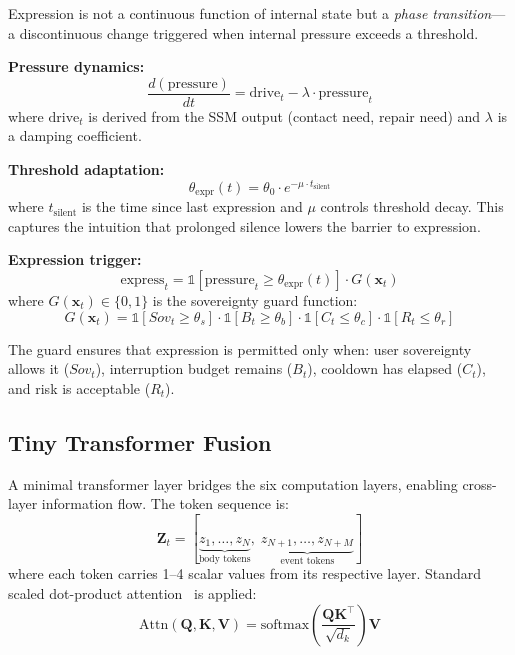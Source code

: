 \documentclass[10pt,twocolumn]{article}
\begin{document}
Expression is not a continuous function of internal state but a \emph{phase transition}---a discontinuous change triggered when internal pressure exceeds a threshold.

\textbf{Pressure dynamics:}
\begin{equation}
\frac{d(\text{pressure})}{dt} = \text{drive}_t - \lambda \cdot \text{pressure}_t
\label{eq:pressure}
\end{equation}
where $\text{drive}_t$ is derived from the SSM output (contact need, repair need) and $\lambda$ is a damping coefficient.

\textbf{Threshold adaptation:}
\begin{equation}
\theta_{\text{expr}}(t) = \theta_0 \cdot e^{-\mu \cdot t_{\text{silent}}}
\label{eq:threshold}
\end{equation}
where $t_{\text{silent}}$ is the time since last expression and $\mu$ controls threshold decay. This captures the intuition that prolonged silence lowers the barrier to expression.

\textbf{Expression trigger:}
\begin{equation}
\text{express}_t = \mathbb{1}[\text{pressure}_t \geq \theta_{\text{expr}}(t)] \cdot G(\mathbf{x}_t)
\label{eq:express}
\end{equation}
where $G(\mathbf{x}_t) \in \{0,1\}$ is the sovereignty guard function:
\begin{equation}
G(\mathbf{x}_t) = \mathbb{1}[Sov_t \geq \theta_s] \cdot \mathbb{1}[B_t \geq \theta_b] \cdot \mathbb{1}[C_t \leq \theta_c] \cdot \mathbb{1}[R_t \leq \theta_r]
\label{eq:guard}
\end{equation}

The guard ensures that expression is permitted only when: user sovereignty allows it ($Sov_t$), interruption budget remains ($B_t$), cooldown has elapsed ($C_t$), and risk is acceptable ($R_t$).

\subsection{Tiny Transformer Fusion}

A minimal transformer layer bridges the six computation layers, enabling cross-layer information flow. The token sequence is:
\begin{equation}
\mathbf{Z}_t = [\underbrace{z_1, \ldots, z_N}_{\text{body tokens}},\; \underbrace{z_{N+1}, \ldots, z_{N+M}}_{\text{event tokens}}]
\end{equation}
where each token carries 1--4 scalar values from its respective layer. Standard scaled dot-product attention~\cite{vaswani2017attention} is applied:
\begin{equation}
\text{Attn}(\mathbf{Q}, \mathbf{K}, \mathbf{V}) = \text{softmax}\left(\frac{\mathbf{Q}\mathbf{K}^\top}{\sqrt{d_k}}\right)\mathbf{V}
\label{eq:attention}
\end{equation}
\end{document}
